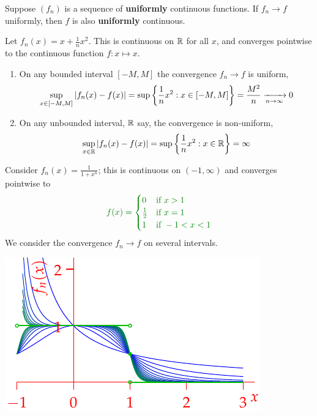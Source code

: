\begin{cor}{}{}
	Suppose $(f_n)$ is a sequence of \textbf{uniformly} continuous functions. If $f_n\to f$ uniformly, then $f$ is also \textbf{uniformly} continuous.
\end{cor}


\goodbreak


\begin{examples}{}{}
	\exstart Let $f_n(x)=x+\frac 1nx^2$. This is continuous on $\mathbb{R}$ for all $x$, and converges pointwise to the continuous function $f:x\mapsto x$.
	\begin{enumerate}\setcounter{enumi}{1}
	  \item[]\begin{enumerate}
	    \item On any bounded interval $[-M,M]$ the convergence $f_n\to f$ is uniform,
	    \[
	    	\sup_{x\in[-M,M]}\left| f_n(x)-f(x)\right|
	    	=\sup\left\{\frac 1nx^2:x\in[-M,M]\right\}
	    	=\frac{M^2}n \xrightarrow[n\to\infty]{}0
	    \]
	    \item On any unbounded interval, $\mathbb{R}$ say, the convergence is non-uniform,
	    \[
	    	\sup_{x\in\R}\nm{f_n(x)-f(x)}=\sup\left\{\frac 1nx^2:x\in\R\right\}=\infty %
	    \]
	  \end{enumerate}
	  
	  \begin{minipage}[t]{0.53\linewidth}\vspace{0pt}
	  \item Consider $f_n(x)=\frac 1{1+x^n}$; this is continuous on $(-1,\infty)$ and converges pointwise to
	  \[
	  	\textcolor{Green}{
	  		f(x)=
		  	\begin{cases}
		  		0&\text{if }x>1\\
		  		\frac 12&\text{if }x=1\\
		  		1&\text{if }-1<x<1
		  	\end{cases}
	  	}
	  \]
	  We consider the convergence $f_n\to f$ on several intervals.
	  \end{minipage}
	  \hfill
	  \begin{minipage}[t]{0.46\linewidth}\vspace{0pt}
	  	\flushright\includegraphics[scale=0.95]{seqex4}
	  \end{minipage}
	

\end{enumerate}
\end{examples}
